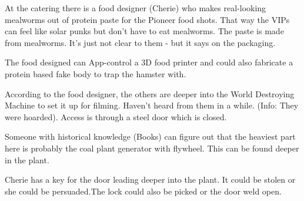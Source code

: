 At the catering there is a food designer (Cherie) who makes real-looking mealworms out of protein paste for the Pioneer food shots.  That way the VIPs can feel like solar punks but don't have to eat mealworms.
The paste is made from mealworms. It's just not clear to them - but it says on the packaging.

The food designed can App-control a 3D food printer and could also fabricate a protein based fake body to trap the hamster with.

According to the food designer, the others are deeper into the World Destroying Machine to set it up for filming. Haven't heard from them in a while. (Info: They were hoarded). Access is through a steel door which is closed.

Someone with historical knowledge (Books) can figure out that the heaviest part here is probably the coal plant generator with flywheel. This can be found deeper in the plant.

Cherie has a key for the door leading deeper into the plant. It could be stolen or she could be persuaded.The lock could also be picked or the door weld open.


